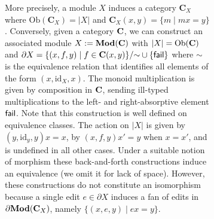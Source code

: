 \begin{figure}
\begin{figure}
More precisely, a module $X$ induces a category $\mathbf{C}_X$
where $\text{Ob}(\mathbf{C}_X) = |X|$ and
$\mathbf{C}_X(x,y)=\{m\mid mx=y\}$.  
%
Conversely, given a category $\mathbf{C}$, we can construct an associated module
$X:=\mathbf{Mod}(\mathbf{C})$ with $|X|=\text{Ob}(\mathbf{C})$ and $\partial X=\{(x,f,y)\mid
f\in\mathbf{C}(x,y)\} /\mathord{\sim}\cup\{\mathsf{fail}\}$ where $\sim$ is the equivalence
relation that identifies all elements of the form
$(x,\text{id}_X,x)$. The monoid multiplication is given by composition
in $\mathbf{C}$, sending ill-typed multiplications to the left- and
right-absorptive element $\mathsf{fail}$.
%
Note that this construction is well defined on equivalence classes. The
action on $|X|$ is given by $(y,\text{id}_y,y)x=x$, by $(x,f,y)x'=y$ when
$x=x'$, and is undefined in all other cases.  Under a suitable notion of
morphism these back-and-forth constructions induce an equivalence (we omit
it for lack of space). However, these constructions do not constitute an
isomorphism because a single edit $e\in \partial X$ induces a fan of edits
in $\partial \mathbf{Mod}(\mathbf{C}_X)$, namely $\{(x,e,y)\mid ex=y\}$.

\fi%
\fi%







\end{figure}
\end{figure}
